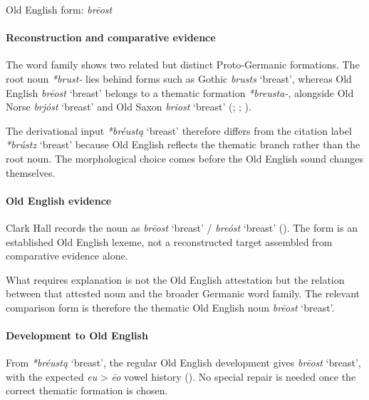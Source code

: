 \documentclass[
  british,
  a4paper,
]{article}
\providecommand{\Recon}[1]{\emph{*#1}}
\begin{document}
Old English form: \emph{brēost}

\paragraph{Reconstruction and comparative
evidence}\label{reconstruction-and-comparative-evidence-84}

The word family shows two related but distinct Proto-Germanic
formations. The root noun {\emph{*brust-}} lies behind forms such as
Gothic {\emph{brusts}} `breast', whereas Old English {\emph{brēost}}
`breast' belongs to a thematic formation {\emph{*breusta-}}, alongside
Old Norse {\emph{brjóst}} `breast' and Old Saxon {\emph{briost}}
`breast' (;
;
).

The derivational input \Recon{bréustą} `breast' therefore differs from
the citation label \Recon{brústz} `breast' because Old English reflects
the thematic branch rather than the root noun. The morphological choice
comes before the Old English sound changes themselves.

\paragraph{Old English evidence}\label{old-english-evidence-84}

Clark Hall records the noun as {\emph{brēost}} `breast' /
{\emph{breóst}} `breast' (). The form is an established Old English lexeme, not a reconstructed
target assembled from comparative evidence alone.

What requires explanation is not the Old English attestation but the
relation between that attested noun and the broader Germanic word
family. The relevant comparison form is therefore the thematic Old
English noun {\emph{brēost}} `breast'.

\paragraph{Development to Old
English}\label{development-to-old-english-84}

From \Recon{bréustą} `breast', the regular Old English development gives
{\emph{brēost}} `breast', with the expected \emph{eu} \textgreater{}
\emph{ēo} vowel history (). No special repair is needed once the correct thematic
formation is chosen.
\end{document}
